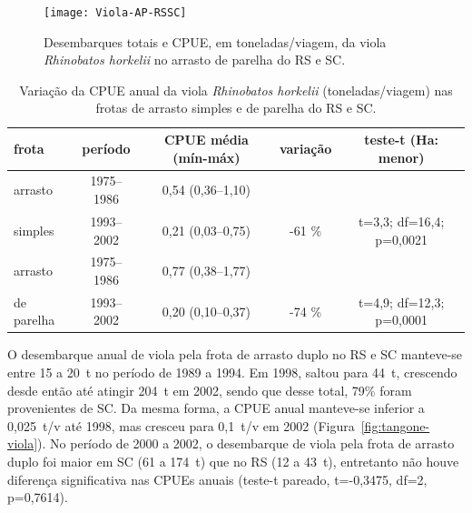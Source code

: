 \documentclass[a4paper,11pt,twoside,showtrims,onecolumn,openright,final]{memoir}
\begin{document}

%
%

\begin{figure}
\begin{center}
\texttt{[image: Viola-AP-RSSC]}
\end{center}
\caption[Desembarques totais e CPUE da viola no arrasto de parelha do RS e SC.]
        {Desembarques totais e CPUE, em toneladas/viagem, da viola \emph{Rhinobatos horkelii} 
         no arrasto de parelha do RS e SC.}
\label{fig:parelha-viola}
\end{figure}



\begin{table}
\caption[Variação da CPUE anual da viola.]
        {Variação da CPUE anual da viola \emph{Rhinobatos horkelii} (toneladas/viagem) 
	 nas frotas de arrasto simples e de parelha do RS e SC.}
\label{tab:cpue-viola}
\begin{small}
\begin{tabular*}{\textwidth}{l@{\extracolsep{\fill}}cccc}
\toprule
frota	   &	período	   &	CPUE média (mín-máx)  &	variação  &	teste-t (Ha: menor)	 \\
\midrule
arrasto	   &	1975--1986 &	0,54 (0,36--1,10)     &		  & 				 \\ 
simples	   &	1993--2002 &	0,21 (0,03--0,75)     &	-61 \%	  &	t=3,3; df=16,4; p=0,0021 \\
\midrule
arrasto	   &	1975--1986 &	0,77 (0,38--1,77)     &           &				 \\
de parelha &	1993--2002 &	0,20 (0,10--0,37)     &	-74 \%	  &	t=4,9; df=12,3; p=0,0001 \\
\bottomrule
\end{tabular*}
\end{small}
\end{table}


O desembarque anual de viola pela frota de arrasto duplo no RS e SC manteve-se entre 15 a 20~t 
no período de 1989 a 1994. Em 1998, saltou para 44~t, crescendo desde então até atingir 204~t 
em 2002, sendo que desse total, 79\% foram provenientes de SC. Da mesma forma, a CPUE anual 
manteve-se inferior a 0,025~t/v até 1998, mas cresceu para 0,1~t/v 
em 2002 (Figura~\ref{fig:tangone-viola}). %
No período de 2000 a 2002, o desembarque de viola pela frota de arrasto duplo foi maior em SC (61 a 174~t) 
que no RS (12 a 43~t), entretanto não houve diferença significativa nas CPUEs anuais 
(teste-t pareado, t=-0,3475, df=2, p=0,7614).
\end{document}
